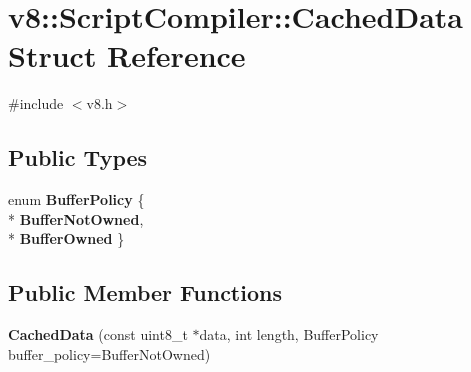\hypertarget{structv8_1_1_script_compiler_1_1_cached_data}{}\section{v8\+:\+:Script\+Compiler\+:\+:Cached\+Data Struct Reference}
\label{structv8_1_1_script_compiler_1_1_cached_data}


{\ttfamily \#include $<$v8.\+h$>$}

\subsection*{Public Types}
\begin{DoxyCompactItemize}
\item 
enum {\bfseries Buffer\+Policy} \{ \\*
{\bfseries Buffer\+Not\+Owned}, 
\\*
{\bfseries Buffer\+Owned}
 \}\hypertarget{structv8_1_1_script_compiler_1_1_cached_data_ac1a1055d361e89b589c3fa98b79b9c25}{}\label{structv8_1_1_script_compiler_1_1_cached_data_ac1a1055d361e89b589c3fa98b79b9c25}

\end{DoxyCompactItemize}
\subsection*{Public Member Functions}
\begin{DoxyCompactItemize}
\item 
{\bfseries Cached\+Data} (const uint8\+\_\+t $\ast$data, int length, Buffer\+Policy buffer\+\_\+policy=Buffer\+Not\+Owned)\hypertarget{structv8_1_1_script_compiler_1_1_cached_data_ab45b2bd22aa86eafd0b8eecbdc72d44e}{}\label{structv8_1_1_script_compiler_1_1_cached_data_ab45b2bd22aa86eafd0b8eecbdc72d44e}

\end{DoxyCompactItemize}
